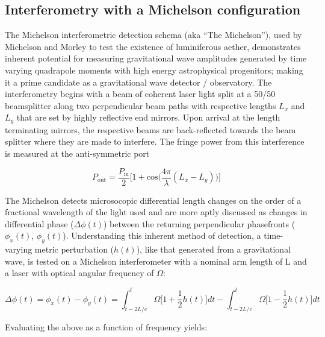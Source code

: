 \subsection{Interferometry with a Michelson configuration}
The Michelson interferometric detection schema (aka ``The Michelson''), used by Michelson and Morley to test the existence of luminiferous aether, demonstrates inherent potential for measuring gravitational wave amplitudes generated by time varying quadrapole moments with high energy astrophysical progenitors; making it a prime candidate as a gravitational wave detector / observatory. The interferometry begins with a beam of coherent laser light split at a 50/50 beamsplitter along two perpendicular beam paths with respective lengths $L_x$ and $L_y$ that are set by highly reflective end mirrors. Upon arrival at the length terminating mirrors, the respective beams are back-reflected towards the beam splitter where they are made to interfere. The fringe power from this interference is measured at the anti-symmetric port 


\begin{equation}\label{fig:pmichas}
	P_\mathrm{out} = \frac{P_\mathrm{in}}{2} \bigg[1+\mathrm{cos}\Big(\frac{4\pi}{\lambda} (L_x - L_y)\Big) \bigg]
\end{equation}

The Michelson detects microsocopic differential length changes on the order of a fractional wavelength of the light used and are more aptly discussed as changes in differential phase ($\Delta \phi(t)$) between the returning perpendicular phasefronts ($\phi_x(t)$, $\phi_y(t)$). Understanding this inherent method of detection, a time-varying metric perturbation ($h(t)$), like that generated from a gravitational wave, is tested on a Michelson interferometer with a nominal arm length of L and a laser with optical angular frequency of $\Omega$:

\begin{equation}
\Delta \phi(t) = \phi_x(t) - \phi_y(t) =  \int_{t-2L/c}^{t} \Omega \bigg[1 + \frac{1}{2}h(t)\bigg]dt - \int_{t-2L/c}^{t} \Omega \bigg[1 - \frac{1}{2}h(t)\bigg]dt 
\end{equation}

Evaluating the above as a function of frequency yields:

